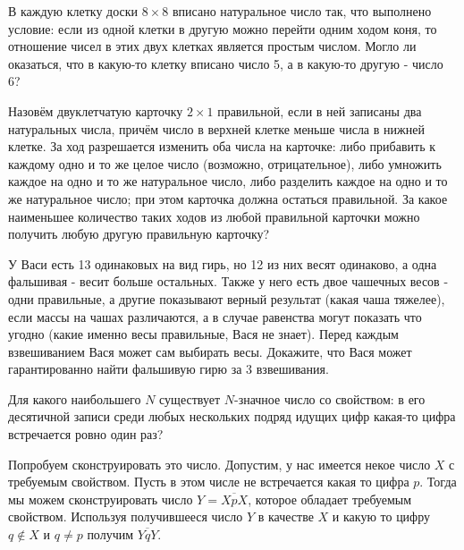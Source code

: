\documentclass[11pt, a4paper]{common/document_template}
\begin{document}
\begin{exercise}
В каждую клетку доски $8 \times 8$ вписано натуральное число так, что выполнено условие: если из одной клетки в другую можно перейти одним ходом коня, то отношение чисел в этих двух клетках является простым числом. Могло ли оказаться, что в какую-то клетку вписано число 5, а в какую-то другую - число 6?
\end{exercise}

\begin{exercise}
Назовём двуклетчатую карточку $2 \times 1$ правильной, если в ней записаны два натуральных числа, причём число в верхней клетке меньше числа в нижней клетке. За ход разрешается изменить оба числа на карточке: либо прибавить к каждому одно и то же целое число (возможно, отрицательное), либо умножить каждое на одно и то же натуральное число, либо разделить каждое на одно и то же натуральное число; при этом карточка должна остаться правильной. За какое наименьшее количество таких ходов из любой правильной карточки можно получить любую другую правильную карточку?
\end{exercise}

\begin{exercise}
У Васи есть 13 одинаковых на вид гирь, но 12 из них весят одинаково, а одна фальшивая - весит больше остальных. Также у него есть двое чашечных весов - одни правильные, а другие показывают верный результат (какая чаша тяжелее), если массы на чашах различаются, а в случае равенства могут показать что угодно (какие именно весы правильные, Вася не знает). Перед каждым взвешиванием Вася может сам выбирать весы. Докажите, что Вася может гарантированно найти фальшивую гирю за 3 взвешивания.
\end{exercise}

\begin{exercise}
Для какого наибольшего $N$ существует $N$-значное число со свойством: в его десятичной записи среди любых нескольких подряд идущих цифр какая-то цифра встречается ровно один раз?
\end{exercise}

\begin{Solution}
Попробуем сконструировать это число. Допустим, у нас имеется некое число $X$ с требуемым свойством. Пусть в этом числе не встречается какая то цифра $p$. Тогда мы можем сконструировать число $Y = \overline{XpX}$, которое обладает требуемым свойством. Используя получившееся число $Y$ в качестве $X$ и какую то цифру $q \notin X$ и $q \neq p$ получим $\overline{YqY}$.
\end{Solution}
\end{document}
